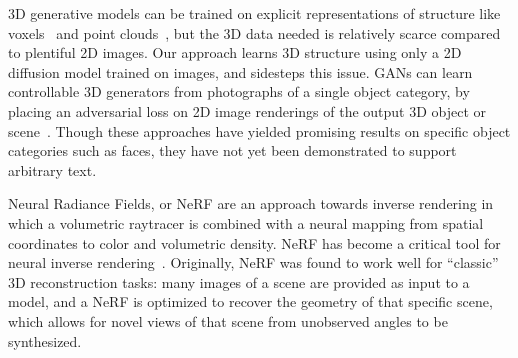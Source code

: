 \documentclass{article} \usepackage{iclr2023_conference,times}
\begin{document}
3D generative models can be trained on explicit representations of structure like voxels~\citep{3dgan, chen2018text2shape} and point clouds~\citep{pointflow, ShapeGF, pointvoxel}, but the 3D data needed is relatively scarce compared to plentiful 2D images.
Our approach learns 3D structure using only a 2D diffusion model trained on images, and sidesteps this issue.
GANs can learn controllable 3D generators from photographs of a single object category, by placing an adversarial loss on 2D image renderings of the output 3D object or scene~\citep{henzler2019platonicgan,HoloGAN2019,orel2022stylesdf}. Though these approaches have yielded promising results on specific object categories such as faces, they have not yet been demonstrated to support arbitrary text.

Neural Radiance Fields, or NeRF \citep{mildenhall2020nerf} are an approach towards inverse rendering in which a volumetric raytracer is combined with a neural mapping from spatial coordinates to color and volumetric density. NeRF has become a critical tool for neural inverse rendering~\citep{tewari2022advances}.
Originally, NeRF was found to work well for ``classic'' 3D reconstruction tasks: many images of a scene are provided as input to a model, and a NeRF is optimized to recover the geometry of that specific scene, which allows for novel views of that scene from unobserved angles to be synthesized.


\newcommand{\teaserwidthb}{.45\textwidth}
\newcommand{\betweencols}{\,\,\,}
\end{document}
